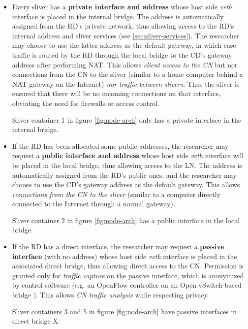 \documentclass[conference]{IEEEtran}
\begin{document}
\begin{itemize}
\item Every sliver has a \textbf{private interface and address} whose host
  side \emph{veth} interface is placed in the internal bridge.  The address is
  automatically assigned from the RD's private network, thus allowing access
  to the RD's internal address and sliver services (see
  \ref{sec:sliver-services}).  The researcher may choose to use the latter
  address as the default gateway, in which case traffic is routed by the RD
  through the local bridge to the CD's gateway address after performing NAT.
  This allows \emph{client access to the CN} but not connections from the CN
  to the sliver (similar to a home computer behind a NAT gateway on the
  Internet) \emph{nor traffic between slivers}.  Thus the sliver is ensured
  that there will be no incoming connections on that interface, obviating the
  need for firewalls or access control.

  Sliver container 1 in figure \ref{fig:node-arch} only has a private
  interface in the internal bridge.

\item If the RD has been allocated some public addresses, the researcher may
  request a \textbf{public interface and address} whose host side \emph{veth}
  interface will be placed in the local bridge, thus allowing access to the
  LN.  The address is automatically assigned from the RD's public ones, and
  the researcher may choose to use the CD's gateway address as the default
  gateway.  This allows \emph{connections from the CN to the sliver} (similar
  to a computer directly connected to the Internet through a normal gateway).

  Sliver container 2 in figure \ref{fig:node-arch} has a public interface in
  the local bridge.

\item If the RD has a direct interface, the researcher may request a
  \textbf{passive interface} (with no address) whose host side \emph{veth}
  interface is placed in the associated direct bridge, thus allowing direct
  access to the CN.  Permission is granted only for \emph{traffic capture} on
  the passive interface, which is anonymized by control software (e.g. an
  OpenFlow controller%
  on an Open vSwitch-based bridge
  \cite{open-vswitch}).  This allows \emph{CN traffic analysis} while
  respecting privacy.

  Sliver containers 3 and 5 in figure \ref{fig:node-arch} have passive
  interfaces in direct bridge X.


\end{itemize}
\end{document}
